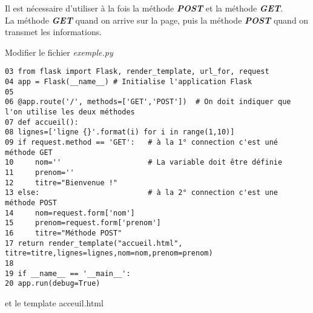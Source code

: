 \documentclass{article}
\newenvironment{Shaded}{}{}
\newcommand{\KeywordTok}[1]{\textcolor[rgb]{0.00,0.44,0.13}{\textbf{{#1}}}}
\newcommand{\StringTok}[1]{\textcolor[rgb]{0.25,0.44,0.63}{{#1}}}
\newcommand{\OtherTok}[1]{\textcolor[rgb]{0.00,0.44,0.13}{{#1}}}
\newcommand{\ErrorTok}[1]{\textcolor[rgb]{1.00,0.00,0.00}{\textbf{{#1}}}}
\newcommand{\NormalTok}[1]{{#1}}
\begin{document}
Il est nécessaire d'utiliser à la fois la méthode \textbf{\emph{POST}}
et la méthode \textbf{\emph{GET}}.\\La méthode \textbf{\emph{GET}} quand
on arrive sur la page, puis la méthode \textbf{\emph{POST}} quand on
transmet les informations.

Modifier le fichier \emph{exemple.py}

\begin{verbatim}
03 from flask import Flask, render_template, url_for, request
04 app = Flask(__name__) # Initialise l'application Flask
05 
06 @app.route('/', methods=['GET','POST'])  # On doit indiquer que l'on utilise les deux méthodes
07 def accueil():
08 lignes=['ligne {}'.format(i) for i in range(1,10)]
09 if request.method == 'GET':   # à la 1° connection c'est uné méthode GET
10     nom=''                    # La variable doit être définie
11     prenom=''
12     titre="Bienvenue !"
13 else:                         # à la 2° connection c'est une méthode POST
14     nom=request.form['nom']
15     prenom=request.form['prenom']
16     titre="Méthode POST"
17 return render_template("accueil.html", titre=titre,lignes=lignes,nom=nom,prenom=prenom)
18
19 if __name__ == '__main__':
20 app.run(debug=True)
\end{verbatim}

et le template acceuil.html

\begin{Shaded}
\end{Shaded}
\end{document}
